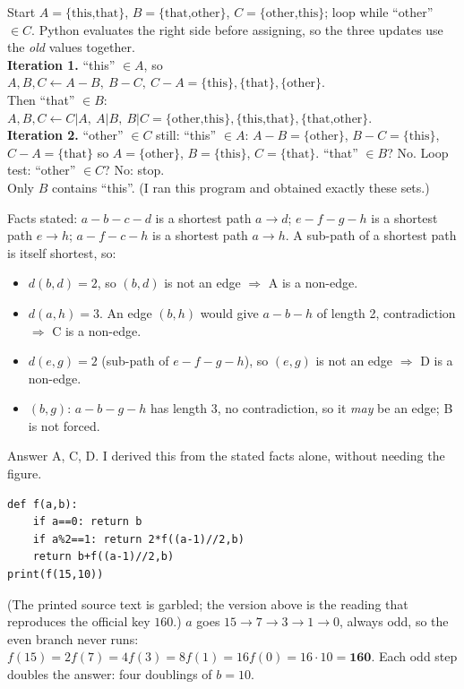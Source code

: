 \documentclass[11pt,a4paper]{article}
\begin{document}
\begin{example}
Start $A=\{\text{this,that}\}$, $B=\{\text{that,other}\}$, $C=\{\text{other,this}\}$; loop while ``other'' $\in C$. Python evaluates the right side before assigning, so the three updates use the \emph{old} values together.\\
\textbf{Iteration 1.} ``this'' $\in A$, so $A,B,C\gets A\!-\!B,\ B\!-\!C,\ C\!-\!A=\{\text{this}\},\{\text{that}\},\{\text{other}\}$.\\
Then ``that'' $\in B$: $A,B,C\gets C|A,\ A|B,\ B|C=\{\text{other,this}\},\{\text{this,that}\},\{\text{that,other}\}$.\\
\textbf{Iteration 2.} ``other'' $\in C$ still: ``this'' $\in A$: $A-B=\{\text{other}\}$, $B-C=\{\text{this}\}$, $C-A=\{\text{that}\}$ so $A=\{\text{other}\}$, $B=\{\text{this}\}$, $C=\{\text{that}\}$. ``that'' $\in B$? No. Loop test: ``other'' $\in C$? No: stop.\\
Only $B$ contains ``this''. (I ran this program and obtained exactly these sets.)
\end{example}

\begin{example}
Facts stated: $a\!-\!b\!-\!c\!-\!d$ is a shortest path $a\to d$; $e\!-\!f\!-\!g\!-\!h$ is a shortest path $e\to h$; $a\!-\!f\!-\!c\!-\!h$ is a shortest path $a\to h$. A sub-path of a shortest path is itself shortest, so:
\begin{itemize}[leftmargin=*,itemsep=1pt]
\item $d(b,d)=2$, so $(b,d)$ is not an edge $\Rightarrow$ A is a non-edge.
\item $d(a,h)=3$. An edge $(b,h)$ would give $a\!-\!b\!-\!h$ of length 2, contradiction $\Rightarrow$ C is a non-edge.
\item $d(e,g)=2$ (sub-path of $e\!-\!f\!-\!g\!-\!h$), so $(e,g)$ is not an edge $\Rightarrow$ D is a non-edge.
\item $(b,g)$: $a\!-\!b\!-\!g\!-\!h$ has length 3, no contradiction, so it \emph{may} be an edge; B is not forced.
\end{itemize}
Answer A, C, D. I derived this from the stated facts alone, without needing the figure.
\end{example}

\begin{example}
\begin{lstlisting}
def f(a,b):
    if a==0: return b
    if a%2==1: return 2*f((a-1)//2,b)
    return b+f((a-1)//2,b)
print(f(15,10))
\end{lstlisting}
(The printed source text is garbled; the version above is the reading that reproduces the official key $160$.) $a$ goes $15\to7\to3\to1\to0$, always odd, so the even branch never runs: $f(15)=2f(7)=4f(3)=8f(1)=16f(0)=16\cdot10=\mathbf{160}$. Each odd step doubles the answer: four doublings of $b=10$.
\end{example}
\end{document}
